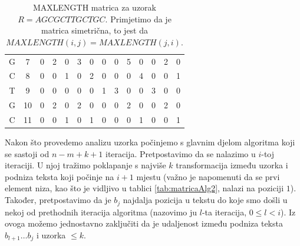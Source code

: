 \documentclass[times, utf8, zavrsni]{fer}
\begin{document}
\begin{table}[]
\begin{tabular}{|cc|cccccccccccc|}
\multicolumn{1}{|c|}{G} & 7 & \multicolumn{1}{c|}{0} & \multicolumn{1}{c|}{2} & \multicolumn{1}{c|}{0} & \multicolumn{1}{c|}{3} & \multicolumn{1}{c|}{0} & \multicolumn{1}{c|}{0} & \multicolumn{1}{c|}{0} & \multicolumn{1}{c|}{5} & \multicolumn{1}{c|}{0} & \multicolumn{1}{c|}{0} & \multicolumn{1}{c|}{2} & 0 \\ \cline{3-14} 
\multicolumn{1}{|c|}{C} & 8 & \multicolumn{1}{c|}{0} & \multicolumn{1}{c|}{0} & \multicolumn{1}{c|}{1} & \multicolumn{1}{c|}{0} & \multicolumn{1}{c|}{2} & \multicolumn{1}{c|}{0} & \multicolumn{1}{c|}{0} & \multicolumn{1}{c|}{0} & \multicolumn{1}{c|}{4} & \multicolumn{1}{c|}{0} & \multicolumn{1}{c|}{0} & 1 \\ \cline{3-14} 
\multicolumn{1}{|c|}{T} & 9 & \multicolumn{1}{c|}{0} & \multicolumn{1}{c|}{0} & \multicolumn{1}{c|}{0} & \multicolumn{1}{c|}{0} & \multicolumn{1}{c|}{0} & \multicolumn{1}{c|}{1} & \multicolumn{1}{c|}{3} & \multicolumn{1}{c|}{0} & \multicolumn{1}{c|}{0} & \multicolumn{1}{c|}{3} & \multicolumn{1}{c|}{0} & 0 \\ \cline{3-14} 
\multicolumn{1}{|c|}{G} & 10 & \multicolumn{1}{c|}{0} & \multicolumn{1}{c|}{2} & \multicolumn{1}{c|}{0} & \multicolumn{1}{c|}{2} & \multicolumn{1}{c|}{0} & \multicolumn{1}{c|}{0} & \multicolumn{1}{c|}{0} & \multicolumn{1}{c|}{2} & \multicolumn{1}{c|}{0} & \multicolumn{1}{c|}{0} & \multicolumn{1}{c|}{2} & 0 \\ \cline{3-14} 
\multicolumn{1}{|c|}{C} & 11 & \multicolumn{1}{c|}{0} & \multicolumn{1}{c|}{0} & \multicolumn{1}{c|}{1} & \multicolumn{1}{c|}{0} & \multicolumn{1}{c|}{1} & \multicolumn{1}{c|}{0} & \multicolumn{1}{c|}{0} & \multicolumn{1}{c|}{0} & \multicolumn{1}{c|}{1} & \multicolumn{1}{c|}{0} & \multicolumn{1}{c|}{0} & 1 \\ \hline
\end{tabular}
\caption{MAXLENGTH matrica za uzorak $R = AGCGCTTGCTGC$. Primjetimo da je matrica simetrična, to jest da $MAXLENGTH(i,j)= MAXLENGTH(j,i)$.}
\label{tab:maxlength}
\end{table}

Nakon što provedemo analizu uzorka počinjemo s glavnim djelom algoritma koji se sastoji od $n-m+k+1$ iteracija. Pretpostavimo da se nalazimo u $i$-toj iteraciji. U njoj tražimo poklapanje s najviše $k$ transformacija između uzorka i podniza teksta koji počinje na $i+1$ mjestu (važno je napomenuti da se prvi element niza, kao što je vidljivo u tablici \ref{tab:matricaAlg2}, nalazi na poziciji $1$). Također, pretpostavimo da je $b_{j}$ najdalja pozicija u tekstu do koje smo došli u nekoj od prethodnih iteracija algoritma (nazovimo ju $l$-ta iteracija, $0\leq l < i$). Iz ovoga možemo jednostavno zaključiti da je udaljenost između podniza teksta $b_{l+1}\dots b_{j}$ i uzorka $\leq k$.
 
\end{document}
